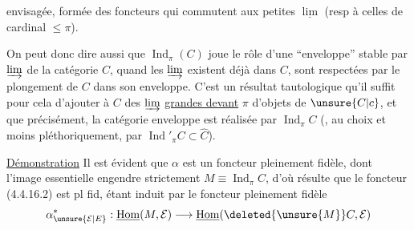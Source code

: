envisagée, formée des foncteurs qui commutent aux petites $\underline{\lim}$ (resp à celles de cardinal $\leq\pi$).

On peut donc dire aussi que $\operatorname{Ind}_\pi(C)$ joue le rôle d'une ``enveloppe'' stable par  $\varinjlim$ de la catégorie  $C$, quand les $\varinjlim$   existent déjà dans $C$, sont respectées par le plongement de $C$ dans son enveloppe. C'est un résultat  tautologique qu'il suffit pour cela d'ajouter à $C$ des $\varinjlim$ \uline{grandes devant} $\pi$ d'objets de $\unsure{C|c}$, et que  précisément, la catégorie enveloppe est réalisée par $\operatorname{Ind}_\pi C$ (, au choix et moins pléthoriquement, par $\operatorname{Ind}'_\pi C\subset\widehat C$).

\uline{Démonstration}  Il est évident que $\alpha$ est un foncteur pleinement fidèle, dont l'image essentielle engendre strictement $M\equiv\operatorname{Ind}_\pi C$, d'où résulte que le foncteur (4.4.16.2) est pl fid, étant induit par le foncteur pleinement fidèle
\[
\alpha_{\unsure{\mathcal E|E}}^{*}:\underline{\mathrm{Hom}}(M,\mathcal E)\longrightarrow\underline{\mathrm{Hom}}(\deleted{\unsure{M}}C,\mathcal E)
\]
